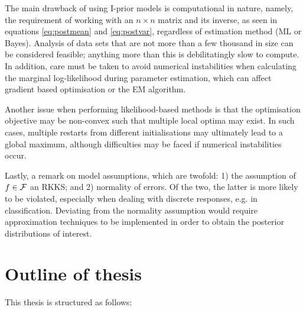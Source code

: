 \documentclass[11pt,twoside,openright,showframe]{report}
\begin{document}
The main drawback of using I-prior models is computational in nature, namely, the requirement of working with an $n \times n$ matrix and its inverse, as seen in equations \cref{eq:postmean} and \cref{eq:postvar}, regardless of estimation method (ML or Bayes).
Analysis of data sets that are not more than a few thousand in size can be considered feasible; anything more than this is debilitatingly slow to compute.
In addition, care must be taken to avoid numerical instabilities when calculating the marginal log-likelihood during parameter estimation, which can affect gradient based optimisation or the EM algorithm.

Another issue when performing likelihood-based methods is that the optimisation objective may be non-convex such that multiple local optima may exist. 
In such cases, multiple restarts from different initialisations may ultimately lead to a global maximum, although difficulties may be faced if numerical instabilities occur.

Lastly, a remark on model assumptions, which are twofold: 1) the assumption of $f \in {\mathcal F}$ an RKKS; and 2) normality of errors.
Of the two, the latter is more likely to be violated, especially when dealing with discrete responses, e.g. in classification.
Deviating from the normality assumption would require approximation techniques to be implemented in order to obtain the posterior distributions of interest.

\section{Outline of thesis}

This thesis is structured as follows:
\end{document}
